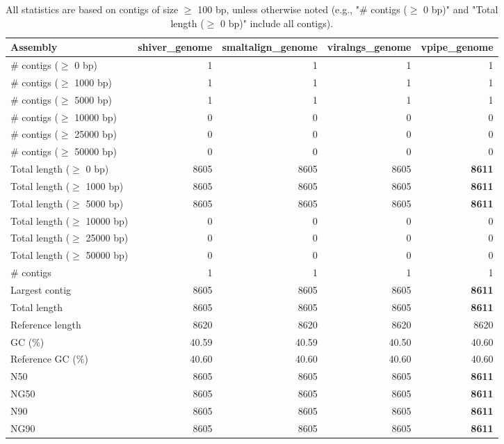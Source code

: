 \documentclass[12pt,a4paper]{article}
\begin{document}
\begin{table}[ht]
\begin{center}
\caption{All statistics are based on contigs of size $\geq$ 100 bp, unless otherwise noted (e.g., "\# contigs ($\geq$ 0 bp)" and "Total length ($\geq$ 0 bp)" include all contigs).}
\begin{tabular}{|l*{4}{|r}|}
\hline
Assembly & shiver\_genome & smaltalign\_genome & viralngs\_genome & vpipe\_genome \\ \hline
\# contigs ($\geq$ 0 bp) & 1 & 1 & 1 & 1 \\ \hline
\# contigs ($\geq$ 1000 bp) & 1 & 1 & 1 & 1 \\ \hline
\# contigs ($\geq$ 5000 bp) & 1 & 1 & 1 & 1 \\ \hline
\# contigs ($\geq$ 10000 bp) & 0 & 0 & 0 & 0 \\ \hline
\# contigs ($\geq$ 25000 bp) & 0 & 0 & 0 & 0 \\ \hline
\# contigs ($\geq$ 50000 bp) & 0 & 0 & 0 & 0 \\ \hline
Total length ($\geq$ 0 bp) & 8605 & 8605 & 8605 & {\bf 8611} \\ \hline
Total length ($\geq$ 1000 bp) & 8605 & 8605 & 8605 & {\bf 8611} \\ \hline
Total length ($\geq$ 5000 bp) & 8605 & 8605 & 8605 & {\bf 8611} \\ \hline
Total length ($\geq$ 10000 bp) & 0 & 0 & 0 & 0 \\ \hline
Total length ($\geq$ 25000 bp) & 0 & 0 & 0 & 0 \\ \hline
Total length ($\geq$ 50000 bp) & 0 & 0 & 0 & 0 \\ \hline
\# contigs & 1 & 1 & 1 & 1 \\ \hline
Largest contig & 8605 & 8605 & 8605 & {\bf 8611} \\ \hline
Total length & 8605 & 8605 & 8605 & {\bf 8611} \\ \hline
Reference length & 8620 & 8620 & 8620 & 8620 \\ \hline
GC (\%) & 40.59 & 40.59 & 40.50 & 40.60 \\ \hline
Reference GC (\%) & 40.60 & 40.60 & 40.60 & 40.60 \\ \hline
N50 & 8605 & 8605 & 8605 & {\bf 8611} \\ \hline
NG50 & 8605 & 8605 & 8605 & {\bf 8611} \\ \hline
N90 & 8605 & 8605 & 8605 & {\bf 8611} \\ \hline
NG90 & 8605 & 8605 & 8605 & {\bf 8611} \\ \hline

\end{tabular}
\end{center}
\end{table}
\end{document}
